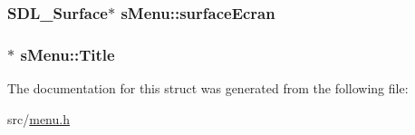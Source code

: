 \subsubsection[{surface\+Ecran}]{\setlength{\rightskip}{0pt plus 5cm}S\+D\+L\+\_\+\+Surface$\ast$ s\+Menu\+::surface\+Ecran}\label{structs_menu_a95c803d0d70319d9adde92ef353b183c}
\hypertarget{structs_menu_a2551447b30a0bc7136a538f59d537260}{}
\subsubsection[{Title}]{$\ast$ s\+Menu\+::\+Title}\label{structs_menu_a2551447b30a0bc7136a538f59d537260}


The documentation for this struct was generated from the following file\+:\begin{DoxyCompactItemize}
\item 
src/\hyperlink{menu_8h}{menu.\+h}\end{DoxyCompactItemize}
